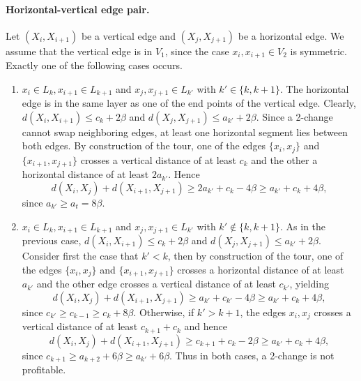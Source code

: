 \documentclass[11pt,DIV=12,a4paper]{scrartcl}
\begin{document}
\paragraph{Horizontal-vertical edge pair.} Let $(X_i,X_{i+1})$ be a vertical edge and $(X_j, X_{j+1})$ be a horizontal edge. We assume that the vertical edge is in $V_1$, since the case $x_i, x_{i+1} \in V_2$ is symmetric. Exactly one of the following cases occurs.
\begin{enumerate}
\item $x_i \in L_k, x_{i+1} \in L_{k+1}$ and $x_j, x_{j+1} \in L_{k'}$ with $k' \in \{k, k+1\}$. The horizontal edge is in the same layer as one of the end points of the vertical edge. Clearly, $d(X_i, X_{i+1}) \le c_k + 2\beta$ and $d(X_j, X_{j+1}) \le a_{k'} + 2\beta$. Since a 2-change cannot swap neighboring edges, at least one horizontal segment lies between both edges. By construction of the tour, one of the edges $\{x_i, x_j\}$ and $\{x_{i+1}, x_{j+1}\}$ crosses a vertical distance of at least $c_k$ and the other a horizontal distance of at least $2a_{k'}$. Hence 
\[ d(X_i, X_j)+d(X_{i+1}, X_{j+1}) \ge 2a_{k'} + c_k - 4\beta \ge a_{k'} + c_k + 4\beta, \]
since $a_{k'} \ge a_t = 8\beta$.
\item $x_i \in L_k,x_{i+1}\in L_{k+1}$ and $x_j,x_{j+1} \in L_{k'}$ with $k' \notin \{k, k+1\}$. As in the previous case, $d(X_i, X_{i+1}) \le c_k + 2\beta$ and $d(X_j, X_{j+1}) \le a_{k'} + 2\beta$. Consider first the case that $k' < k$, then by construction of the tour, one of the edges $\{x_i,x_j\}$ and $\{x_{i+1}, x_{j+1}\}$ crosses a horizontal distance of at least $a_{k'}$ and the other edge crosses a vertical distance of at least  $c_{k'}$, yielding \[d(X_i,X_j) + d(X_{i+1},X_{j+1}) \ge a_{k'} + c_{k'} - 4\beta \ge a_{k'} + c_{k} + 4\beta, \] since $c_{k' }\ge c_{k-1} \ge c_k + 8\beta$. Otherwise, if $k'> k+1$, the edges ${x_i,x_j}$ crosses a vertical distance of at least $c_{k+1}+c_k$ and hence \[d(X_i,X_j) + d(X_{i+1},X_{j+1}) \ge  c_{k+1} + c_k - 2\beta \ge a_{k'} + c_{k} + 4\beta, \] since $c_{k+1} \ge a_{k+2} + 6\beta \ge a_{k'}  +6\beta$. Thus in both cases, a 2-change is not profitable. %
\end{enumerate}
\end{document}

